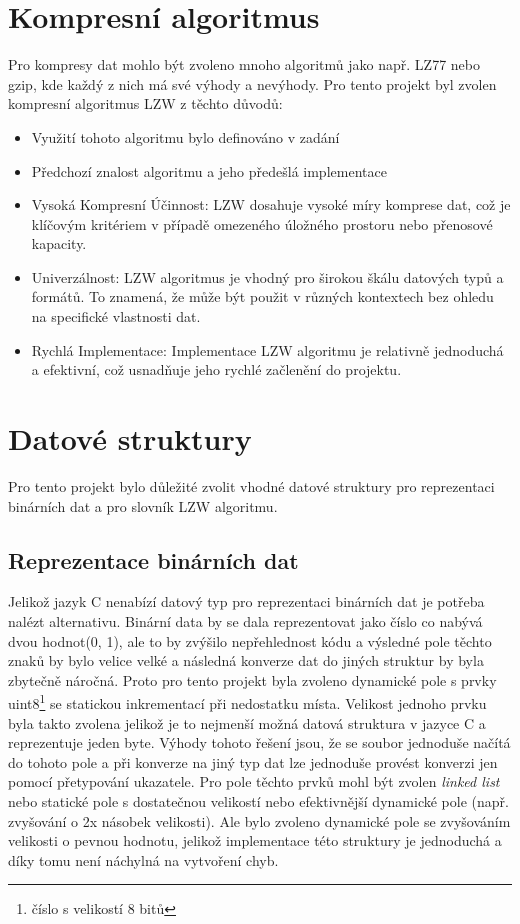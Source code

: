 \documentclass[12pt]{report}
\begin{document}
    \section{Kompresní algoritmus}
    Pro kompresy dat mohlo být zvoleno mnoho algoritmů jako např. LZ77 nebo gzip, kde každý z nich má své výhody a nevýhody. Pro tento projekt byl zvolen kompresní algoritmus LZW z těchto důvodů:
    \begin{itemize}
        \item Využití tohoto algoritmu bylo definováno v zadání
        \item Předchozí znalost algoritmu a jeho předešlá implementace
        \item Vysoká Kompresní Účinnost: LZW dosahuje vysoké míry komprese dat, což je klíčovým kritériem v případě omezeného úložného prostoru nebo přenosové kapacity.
        \item Univerzálnost: LZW algoritmus je vhodný pro širokou škálu datových typů a formátů. To znamená, že může být použit v různých kontextech bez ohledu na specifické vlastnosti dat.
        \item Rychlá Implementace: Implementace LZW algoritmu je relativně jednoduchá a efektivní, což usnadňuje jeho rychlé začlenění do projektu.
    \end{itemize}

    \section{Datové struktury}
    Pro tento projekt bylo důležité zvolit vhodné datové struktury pro reprezentaci binárních dat a pro slovník LZW algoritmu.

    \subsection{Reprezentace binárních dat}
    Jelikož jazyk C nenabízí datový typ pro reprezentaci binárních dat je potřeba nalézt alternativu. 
    Binární data by se dala reprezentovat jako číslo co nabývá dvou hodnot(0, 1), ale to by zvýšilo nepřehlednost kódu a výsledné pole těchto znaků by bylo velice velké a následná konverze dat do jiných struktur by byla zbytečně náročná. 
    Proto pro tento projekt byla zvoleno dynamické pole s prvky uint8\footnote{číslo s velikostí 8 bitů}  se statickou inkrementací při nedostatku místa. Velikost jednoho prvku byla takto zvolena jelikož je to nejmenší možná datová struktura v jazyce C a reprezentuje jeden byte. Výhody tohoto řešení jsou, že se soubor jednoduše načítá do tohoto pole a při konverze na jiný typ dat lze jednoduše provést konverzi jen pomocí přetypování ukazatele.
    Pro pole těchto prvků mohl být zvolen \textit{linked list} nebo statické pole s dostatečnou velikostí nebo efektivnější dynamické pole (např. zvyšování o 2x násobek velikosti). Ale bylo zvoleno dynamické pole se zvyšováním velikosti o pevnou hodnotu, jelikož implementace této struktury je jednoduchá a díky tomu není náchylná na vytvoření chyb.
\end{document}
